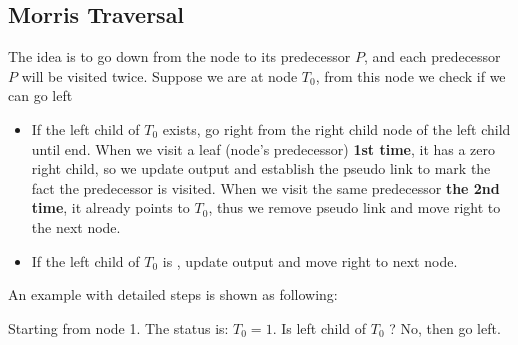 \subsection{Morris Traversal}
The idea is to go down from the node to its predecessor $P$, and each predecessor $P$ will be visited twice. Suppose we are at node $T_0$, from this node we check if we can go left
\begin{itemize}
\item If the left child of $T_0$ exists, go right from the right child node of the left child until end. When we visit a leaf (node's predecessor) \textbf{1st time}, it has a zero right child, so we update output and establish the pseudo link  to mark the fact the predecessor is visited. When we visit the same predecessor \textbf{the 2nd time}, it already points to $T_0$, thus we remove pseudo link and move right to the next node.
\item If the left child of $T_0$ is , update output and move right to next node.
\end{itemize}
An example with detailed steps is shown as following:
\begin{figure}[H]
\end{figure}
Starting from node 1. The status is: $T_0 = 1$. Is left child of $T_0$ ? No, then go left. 
\begin{figure}[H]
\end{figure}
